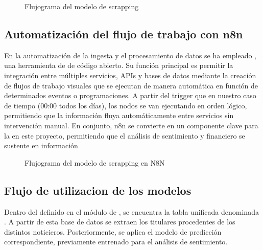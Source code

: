 \documentclass[letterpaper,10pt,spanish]{sphinxmanual}
\begin{document}
\begin{figure}[htbp]
\centering
\capstart

\noindent{}
\caption{ Flujograma del modelo de scrapping}\label{\detokenize{AutomatizacionFinanciera:id1}}\end{figure}


\subsection{Automatización del flujo de trabajo con n8n}
\label{\detokenize{AutomatizacionFinanciera:automatizacion-del-flujo-de-trabajo-con-n8n}}
\sphinxAtStartPar
En la automatización de la ingesta y el procesamiento de datos se ha empleado , una herramienta de  de código abierto. Su función principal es permitir la integración entre múltiples servicios, APIs y bases de datos mediante la creación de flujos de trabajo visuales que se ejecutan de manera automática en función de determinados eventos o programaciones. A partir del trigger que en nuestro caso de tiempo (00:00 todos los días), los nodos se van ejecutando en orden lógico, permitiendo que la información fluya automáticamente entre servicios sin intervención manual. En conjunto, n8n se convierte en un componente clave para la  en este proyecto, permitiendo que el análisis de sentimiento y financiero se sustente en información

\begin{figure}[htbp]
\centering
\capstart

\noindent{}
\caption{ Flujograma del modelo de scrapping en N8N}\label{\detokenize{AutomatizacionFinanciera:id2}}\end{figure}


\subsection{Flujo de utilizacion de los modelos}
\label{\detokenize{AutomatizacionFinanciera:flujo-de-utilizacion-de-los-modelos}}
\sphinxAtStartPar
Dentro del  definido en el módulo de , se encuentra la tabla unificada denominada . A partir de esta base de datos se extraen los titulares procedentes de los distintos noticieros. Posteriormente, se aplica el modelo de predicción correspondiente, previamente entrenado para el análisis de sentimiento.
\end{document}
